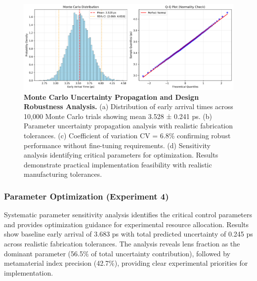 \documentclass[aps,prl,reprint,groupedaddress,floatfix]{revtex4-1}
\begin{document}
\begin{figure}[t]
    \centering
    \includegraphics[width=1.0\textwidth]{experiment3_monte_carlo_uncertainty.png}
    \caption{\textbf{Monte Carlo Uncertainty Propagation and Design Robustness Analysis.} (a) Distribution of early arrival times across 10,000 Monte Carlo trials showing mean 3.528 ± 0.241 ps. (b) Parameter uncertainty propagation analysis with realistic fabrication tolerances. (c) Coefficient of variation CV = 6.8\% confirming robust performance without fine-tuning requirements. (d) Sensitivity analysis identifying critical parameters for optimization. Results demonstrate practical implementation feasibility with realistic manufacturing tolerances.}
    \label{fig:uncertainty_analysis}
\end{figure}

\subsubsection{Parameter Optimization (Experiment 4)}

Systematic parameter sensitivity analysis identifies the critical control parameters and provides optimization guidance for experimental resource allocation. Results show baseline early arrival of 3.683 ps with total predicted uncertainty of 0.245 ps across realistic fabrication tolerances. The analysis reveals lens fraction as the dominant parameter (56.5\% of total uncertainty contribution), followed by metamaterial index precision (42.7\%), providing clear experimental priorities for implementation.
\end{document}
